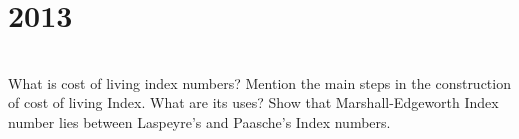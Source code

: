 \section*{2013}
\vspace{-.5cm}
\hrulefill \smallskip\\
 What is cost of living index numbers? Mention the main steps in the construction of cost of living Index. What are its uses?
\myline
{} Show that Marshall-Edgeworth Index number lies between Laspeyre's and Paasche's Index numbers.
